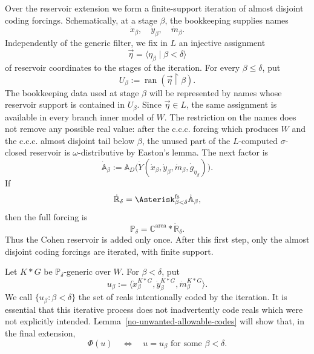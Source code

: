 \documentclass[a4paper,11pt]{article}
\newcommand{\forceP}{\mathbb{P}}
\newcommand{\forceR}{\mathbb{R}}
\newcommand{\forceA}{\mathbb{A}}
\newcommand{\forceC}{\mathbb{C}}
\begin{document}
Over the reservoir extension we form a finite-support iteration of almost disjoint coding forcings. Schematically, at a stage $\beta$, the bookkeeping supplies names
\[
   \dot x_\beta,\quad
   \dot y_\beta,\quad
   \dot m_\beta.
\]
Independently of the generic filter, we fix in $L$ an injective assignment
\[
   \vec\eta=\langle\eta_\beta\mid\beta<\delta\rangle
\]
of reservoir coordinates to the stages of the iteration.  For every
$\beta\leq\delta$, put
\[
   U_\beta:=\operatorname{ran}(\vec\eta\upharpoonright\beta).
\]
The bookkeeping data used at stage $\beta$ will be represented by names whose
reservoir support is contained in $U_\beta$.  Since $\vec\eta\in L$, the same
assignment is available in every branch inner model of $W$.  The restriction
on the names does not remove any possible real value: after the c.c.c. forcing
which produces $W$ and the c.c.c. almost disjoint tail below $\beta$, the
unused part of the $L$-computed $\sigma$-closed reservoir is
$\omega$-distributive by Easton's lemma.  The next factor is
\[
   \dot{\forceA}_\beta
   :=\mathbb A_D\bigl(
      \dot Y(\dot x_\beta,\dot y_\beta,\dot m_\beta,
             \dot g_{\eta_\beta})
   \bigr).
\]
If
\[
   \dot{\forceR}_\delta
   =\Asterisk_{\beta<\delta}^{\mathrm{fs}}
      \dot{\forceA}_\beta,
\]
then the full forcing is
\[
   \forceP_\delta
   =\forceC^{\mathrm{area}}*\dot{\forceR}_\delta.
\]
Thus the Cohen reservoir is added only once. After this first step, only the almost disjoint coding forcings are iterated, with finite support.

Let $K*G$ be $\forceP_\delta$-generic over $W$. For $\beta<\delta$, put
\[
   u_\beta
   :=\bigl\langle
      \dot x_\beta^{K*G},
      \dot y_\beta^{K*G},
      \dot m_\beta^{K*G}
   \bigr\rangle.
\]
We call $\{u_\beta:\beta<\delta\}$ the set of reals intentionally coded by the iteration. It is essential that this iterative process does not inadvertently code reals which were not explicitly intended. Lemma~\ref{no-unwanted-allowable-codes} will show that, in the final extension,
\[
   \Phi(u)
   \quad\Longleftrightarrow\quad
   u=u_\beta\text{ for some }\beta<\delta.
\]
\end{document}
